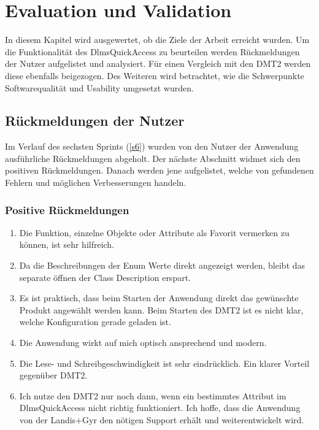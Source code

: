 
\chapter{Evaluation und Validation}\label{eval}
In diesem Kapitel wird ausgewertet, ob die Ziele der Arbeit erreicht wurden.
Um die Funktionalität des DlmsQuickAccess zu beurteilen werden Rückmeldungen der Nutzer aufgelistet und analysiert.
Für einen Vergleich mit den \ac{DMT2} werden diese ebenfalls beigezogen.
Des Weiteren wird betrachtet, wie die Schwerpunkte Softwarequalität und Usability umgesetzt wurden.



\section{Rückmeldungen der Nutzer}
Im Verlauf des sechsten Sprints (\ref{s6}) wurden von den Nutzer der Anwendung ausführliche Rückmeldungen abgeholt.
Der nächste Abschnitt widmet sich den positiven Rückmeldungen.
Danach werden jene aufgelistet, welche von gefundenen Fehlern und möglichen Verbesserungen handeln.
\subsection{Positive Rückmeldungen}

\begin{enumerate}
   \item Die Funktion, einzelne Objekte oder Attribute als Favorit vermerken zu können, ist sehr hilfreich.
   \item Da die Beschreibungen der Enum Werte direkt angezeigt werden, bleibt das separate öffnen der Class Description erspart.
   \item Es ist praktisch, dass beim Starten der Anwendung direkt das gewünschte Produkt angewählt werden kann. Beim Starten des \ac{DMT2} ist es nicht klar, welche Konfiguration gerade geladen ist.
   \item Die Anwendung wirkt auf mich optisch ansprechend und modern.
   \item Die Lese- und Schreibgeschwindigkeit ist sehr eindrücklich. Ein klarer Vorteil gegenüber \ac{DMT2}.
   \item Ich nutze den \ac{DMT2} nur noch dann, wenn ein bestimmtes Attribut im DlmsQuickAccess nicht richtig funktioniert. Ich hoffe, dass die Anwendung von der Landis+Gyr den nötigen Support erhält und weiterentwickelt wird.
\end{enumerate}

